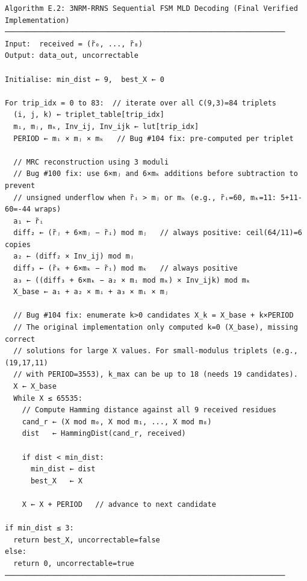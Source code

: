 \documentclass[
  english,
  12pt,
]{report}
\begin{document}
\begin{verbatim}
Algorithm E.2: 3NRM-RRNS Sequential FSM MLD Decoding (Final Verified Implementation)
─────────────────────────────────────────────────────────────────
Input:  received = (r̃₀, ..., r̃₈)
Output: data_out, uncorrectable

Initialise: min_dist ← 9,  best_X ← 0

For trip_idx = 0 to 83:  // iterate over all C(9,3)=84 triplets
  (i, j, k) ← triplet_table[trip_idx]
  mᵢ, mⱼ, mₖ, Inv_ij, Inv_ijk ← lut[trip_idx]
  PERIOD ← mᵢ × mⱼ × mₖ   // Bug #104 fix: pre-computed per triplet

  // MRC reconstruction using 3 moduli
  // Bug #100 fix: use 6×mⱼ and 6×mₖ additions before subtraction to prevent
  // unsigned underflow when r̃ᵢ > mⱼ or mₖ (e.g., r̃ᵢ=60, mₖ=11: 5+11-60=-44 wraps)
  a₁ ← r̃ᵢ
  diff₂ ← (r̃ⱼ + 6×mⱼ − r̃ᵢ) mod mⱼ   // always positive: ceil(64/11)=6 copies
  a₂ ← (diff₂ × Inv_ij) mod mⱼ
  diff₃ ← (r̃ₖ + 6×mₖ − r̃ᵢ) mod mₖ   // always positive
  a₃ ← ((diff₃ + 6×mₖ − a₂ × mᵢ mod mₖ) × Inv_ijk) mod mₖ
  X_base ← a₁ + a₂ × mᵢ + a₃ × mᵢ × mⱼ

  // Bug #104 fix: enumerate k>0 candidates X_k = X_base + k×PERIOD
  // The original implementation only computed k=0 (X_base), missing correct
  // solutions for large X values. For small-modulus triplets (e.g., (19,17,11)
  // with PERIOD=3553), k_max can be up to 18 (needs 19 candidates).
  X ← X_base
  While X ≤ 65535:
    // Compute Hamming distance against all 9 received residues
    cand_r ← (X mod m₀, X mod m₁, ..., X mod m₈)
    dist   ← HammingDist(cand_r, received)

    if dist < min_dist:
      min_dist ← dist
      best_X   ← X

    X ← X + PERIOD   // advance to next candidate

if min_dist ≤ 3:
  return best_X, uncorrectable=false
else:
  return 0, uncorrectable=true
─────────────────────────────────────────────────────────────────
\end{verbatim}
\end{document}
